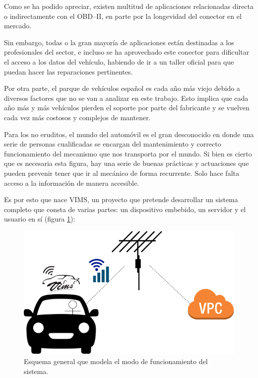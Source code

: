 Como se ha podido apreciar, existen multitud de aplicaciones relacionadas directa
o indirectamente con el \ac{OBD}--II, en parte por la longevidad del conector
en el mercado.

Sin embargo, todas o la gran mayoría de aplicaciones están destinadas a los profesionales
del sector, e incluso se ha aprovechado este conector para dificultar el acceso a
los datos del vehículo, habiendo de ir a un taller oficial para que puedan hacer
las reparaciones pertinentes.

Por otra parte, el parque de vehículos español es cada año más viejo debido a
diversos factores que no se van a analizar en este trabajo. Esto implica que cada
año más y más vehículos pierden el soporte por parte del fabricante y se vuelven
cada vez más costosos y complejos de mantener.

Para los no eruditos, el mundo del automóvil es el gran desconocido en donde una
serie de personas cualificadas se encargan del mantenimiento y correcto funcionamiento
del mecanismo que nos transporta por el mundo. Si bien es cierto que es necesaria
esta figura, hay una serie de buenas prácticas y actuaciones que pueden prevenir
tener que ir al mecánico de forma recurrente. Solo hace falta acceso a la información
de manera accesible.

Es por esto que nace \ac{VIMS}, un proyecto que pretende desarrollar un sistema completo
que consta de varias partes: un dispositivo embebido, un servidor y el usuario en sí
(figura \ref{fig:general-scheme}):

\begin{figure}[H]
  \centering
  \includegraphics[width=\linewidth]{images/general-scheme.png}
  \caption{Esquema general que modela el modo de funcionamiento del sistema.}
  \label{fig:general-scheme}
\end{figure}

